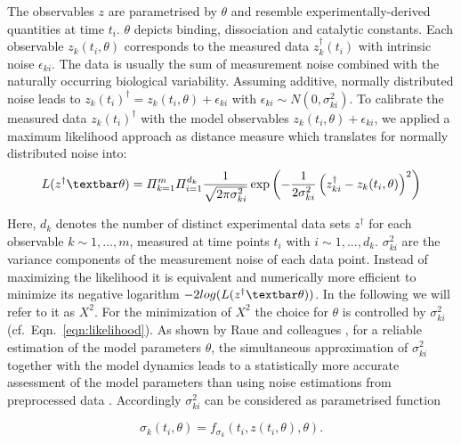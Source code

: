 The observables $z$ are parametrised by $\theta$ and resemble experimentally-derived quantities at time $t_i$. $\theta$ depicts binding, dissociation and catalytic constants. Each observable $z_k(t_i,\theta)$ corresponds to the measured data $z_k^\dag(t_i)$ with intrinsic noise $\epsilon_{ki}$. The data is usually the sum of measurement noise combined with the naturally occurring biological variability. Assuming additive, normally distributed noise leads to $z_k(t_i)^\dag = z_k(t_i,\theta) + \epsilon_{ki}$ with $\epsilon_{ki} \sim N(0,\sigma_{ki}^2)$. To calibrate the measured data $z_k(t_i)^\dag$ with the model observables $z_k(t_i,\theta)+\epsilon_{ki}$, we applied a maximum likelihood approach as distance measure which translates for normally distributed noise into:
\begin{equation}
\label{eqn:likelihood}
L(z^\dag \textbar \theta) = \varPi_{k=1}^m \varPi_{i=1}^{d_k} \frac{1}{\sqrt{2\pi \sigma_{ki}^2}}\exp \left( -\frac{1}{2\sigma_{ki}^2}\left(z_{ki}^\dag - z_k(t_i,\theta)\right)^2\right)
\end{equation}
  
Here, $d_k$ denotes the number of distinct experimental data sets $z^\dag$ for each observable $k\sim 1,...,m$, measured at time points $t_i$ with $i\sim 1,...,d_k$. $\sigma_{ki}^2$ are the variance components of the measurement noise of each data point. Instead of maximizing the likelihood it is equivalent and numerically more efficient to minimize its negative logarithm $-2log(L(z^\dag\textbar\theta))$. In the following we will refer to it as $X^2$.  For the minimization of $X^2$ the choice for $\theta$ is controlled by $\sigma_{ki}^2$ (cf.\ Eqn.\ \ref{eqn:likelihood}). As shown by Raue and colleagues \cite{Raue2013}, for a reliable estimation of the model parameters $\theta$, the simultaneous approximation of $\sigma_{ki}^2$ together with the model dynamics leads to a statistically more accurate assessment of the model parameters than using noise estimations from preprocessed data \cite{Raue2013}. Accordingly $\sigma_{ki}^2$ can be considered as parametrised function

\begin{equation}
\sigma_{k}(t_i,\theta) = f_{\sigma_{k}}(t_i,z(t_i,\theta),\theta).
\end{equation}    


